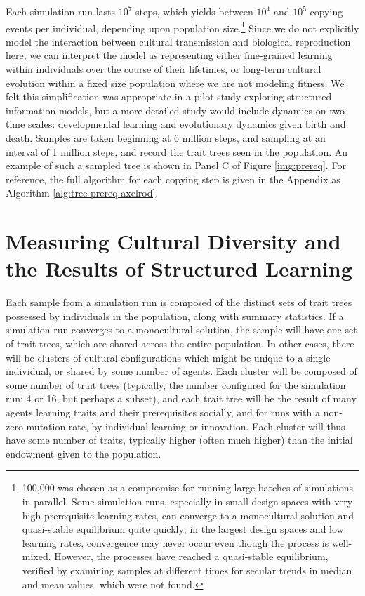 Each simulation run lasts $10^7$ steps, which yields between $10^4$ and
$10^5$ copying events per individual, depending upon population
size.\footnote{100,000 was chosen as a compromise for running large
  batches of simulations in parallel. Some simulation runs, especially
  in small design spaces with very high prerequisite learning rates, can
  converge to a monocultural solution and quasi-stable equilibrium quite
  quickly; in the largest design spaces and low learning rates,
  convergence may never occur even though the process is well-mixed.
  However, the processes have reached a quasi-stable equilibrium,
  verified by examining samples at different times for secular trends in
  median and mean values, which were not found.} Since we do not
explicitly model the interaction between cultural transmission and
biological reproduction here, we can interpret the model as representing
either fine-grained learning within individuals over the course of their
lifetimes, or long-term cultural evolution within a fixed size
population where we are not modeling fitness. We felt this
simplification was appropriate in a pilot study exploring structured
information models, but a more detailed study would include dynamics on
two time scales: developmental learning and evolutionary dynamics given
birth and death. Samples are taken beginning at 6 million steps, and
sampling at an interval of 1 million steps, and record the trait trees
seen in the population. An example of such a sampled tree is shown in
Panel C of Figure \ref{img:prereq}. For reference, the full algorithm
for each copying step is given in the Appendix as Algorithm
\ref{alg:tree-prereq-axelrod}.
\section{Measuring Cultural Diversity and the Results of Structured
Learning}\label{measuring-cultural-diversity-and-the-results-of-structured-learning}

Each sample from a simulation run is composed of the distinct sets of
trait trees possessed by individuals in the population, along with
summary statistics. If a simulation run converges to a monocultural
solution, the sample will have one set of trait trees, which are shared
across the entire population. In other cases, there will be clusters of
cultural configurations which might be unique to a single individual, or
shared by some number of agents. Each cluster will be composed of some
number of trait trees (typically, the number configured for the
simulation run: 4 or 16, but perhaps a subset), and each trait tree will
be the result of many agents learning traits and their prerequisites
socially, and for runs with a non-zero mutation rate, by individual
learning or innovation. Each cluster will thus have some number of
traits, typically higher (often much higher) than the initial endowment
given to the population.

